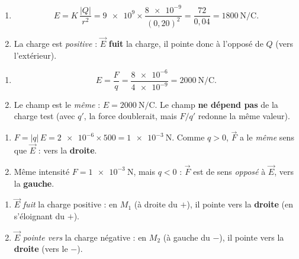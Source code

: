 \documentclass[11pt,a4paper]{article}
\newcommand{\vv}[1]{\vec{#1}}\newcommand{\ds}{\displaystyle}
\begin{document}

\begin{corrige}
\begin{enumerate}[label=\alph*)]
  \item \[ E = K\,\frac{|Q|}{r^2} = \num{9e9}\times\frac{\num{8e-9}}{(0{,}20)^2}
             = \frac{72}{0{,}04} = \SI{1800}{\newton\per\coulomb}. \]
  \item La charge est \emph{positive} : $\vv{E}$ \textbf{fuit} la charge, il pointe donc à l'opposé
        de $Q$ (vers l'extérieur).
\end{enumerate}
\end{corrige}

\begin{corrige}
\begin{enumerate}[label=\alph*)]
  \item \[ E = \frac{F}{q} = \frac{\num{8e-6}}{\num{4e-9}} = \SI{2000}{\newton\per\coulomb}. \]
  \item Le champ est le \emph{même} : $E = \SI{2000}{\newton\per\coulomb}$. Le champ \textbf{ne
        dépend pas} de la charge test (avec $q'$, la force doublerait, mais $F/q'$ redonne la même
        valeur).
\end{enumerate}
\end{corrige}

\begin{corrige}
\begin{enumerate}[label=\alph*)]
  \item $F = |q|\,E = \num{2e-6}\times 500 = \SI{1e-3}{\newton}$. Comme $q>0$, $\vv{F}$ a le
        \emph{même} sens que $\vv{E}$ : vers la \textbf{droite}.
  \item Même intensité $F = \SI{1e-3}{\newton}$, mais $q<0$ : $\vv{F}$ est de sens \emph{opposé} à
        $\vv{E}$, vers la \textbf{gauche}.
\end{enumerate}
\end{corrige}

\begin{corrige}
\begin{enumerate}[label=\alph*)]
  \item $\vv{E}$ \emph{fuit} la charge positive : en $M_1$ (à droite du $+$), il pointe vers la
        \textbf{droite} (en s'éloignant du $+$).
  \item $\vv{E}$ \emph{pointe vers} la charge négative : en $M_2$ (à gauche du $-$), il pointe vers
        la \textbf{droite} (vers le $-$).
\end{enumerate}
\end{corrige}
\end{document}
